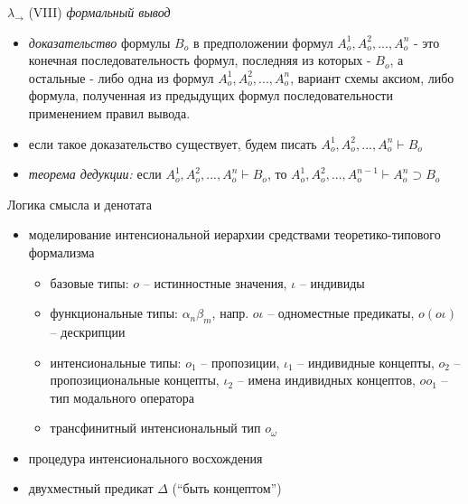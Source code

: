 \documentclass{beamer}
\begin{document}
\begin{frame}{$\lambda_\to$ (VIII)}
\textit{формальный вывод}\\
\bigskip
\begin{itemize}
  \item \textit{доказательство} формулы $B_o$ в предположении формул $A_o^1, A_o^2, ..., A_o^n$ - это конечная последовательность формул, последняя из которых - $B_o$, а остальные - либо одна из формул $A_o^1, A_o^2, ..., A_o^n$, вариант схемы аксиом, либо формула, полученная из предыдущих формул последовательности применением правил вывода.
  \item если такое доказательство существует, будем писать $A_o^1, A_o^2, ..., A_o^n \vdash B_o$
  \item \textit{теорема дедукции:} если $A_o^1, A_o^2, ..., A_o^n \vdash B_o$, то $A_o^1, A_o^2, ..., A_o^{n-1} \vdash A_o^n \supset B_o$
\end{itemize}
\end{frame}

\begin{frame}{Логика смысла и денотата}
\begin{itemize}
    \item моделирование интенсиональной иерархии средствами теоретико-типового формализма
   	\medskip
         \begin{itemize} 
	        \item базовые типы: $o$ -- истинностные значения, $\iota$ -- индивиды
	        \item функциональные типы: $\alpha_n \beta_m$, напр. $o \iota$ -- одноместные предикаты, $o(o \iota)$ -- дескрипции
	        \item интенсиональные типы: $o_1$ -- пропозиции, $\iota_1$ -- индивидные концепты, $o_2$ -- пропозициональные концепты, $\iota_2$ -- имена индивидных концептов, $oo_1$ -- тип модального оператора
	        \item трансфинитный интенсиональный тип $o_\omega$
	    \end{itemize}
	\medskip
	\item процедура интенсионального восхождения
	\medskip
	\item двухместный предикат $\Delta$ (``быть концептом'')
\end{itemize}
\end{frame}
\end{document}
